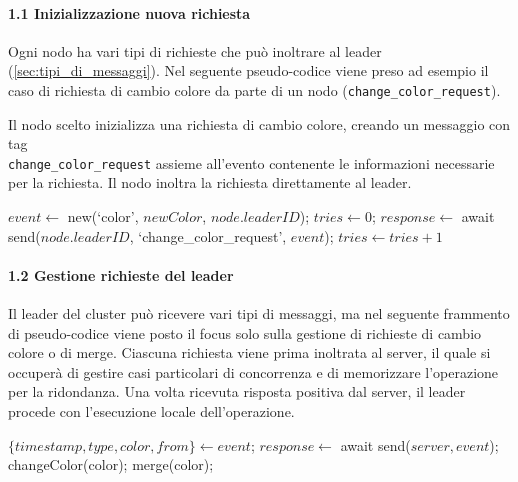 \documentclass[12pt, a4paper]{report}
\begin{document}
\paragraph{1.1 Inizializzazione nuova richiesta}

Ogni nodo ha vari tipi di richieste che pu\`o inoltrare al leader (\ref{sec:tipi_di_messaggi}). Nel seguente pseudo-codice viene preso ad esempio il caso di richiesta di cambio colore da parte di un nodo (\texttt{change\_color\_request}).

Il nodo scelto inizializza una richiesta di cambio colore, creando un messaggio con tag \\ \texttt{change\_color\_request} assieme all'evento contenente le informazioni necessarie per la richiesta. Il nodo inoltra la richiesta direttamente al leader.

\begin{algorithm}[H]
\caption{Inizializzazione richiesta di cambio colore}
\begin{algorithmic}[1]
    \State $event \gets$ new(`color', $newColor$, $node.leaderID$);
    \State $tries \gets 0$;
    \Do
        \State $response \gets$ await send($node.leaderID$, `change\_color\_request', $event$);
        \State $tries \gets tries + 1$
\EndProcedure
\end{algorithmic}
\end{algorithm}

\paragraph{1.2 Gestione richieste del leader}

Il leader del cluster pu\`o ricevere vari tipi di messaggi, ma nel seguente frammento di pseudo-codice viene posto il focus solo sulla gestione di richieste di cambio colore o di merge. Ciascuna richiesta viene prima inoltrata al server, il quale si occuper\`a di gestire casi particolari di concorrenza e di memorizzare l'operazione per la ridondanza. Una volta ricevuta risposta positiva dal server, il leader procede con l'esecuzione locale dell'operazione.

\begin{algorithm}[H]
\caption{Gestione delle richieste nodo leader}
\begin{algorithmic}[1]
    \State $\{timestamp, type, color, from\} \gets event$;
        \State $response \gets$ await send($server, event$);
                \State changeColor(color);
                \State merge(color);
            \EndIf
        \EndIf
    \EndIf
\EndProcedure
\end{algorithmic}
\end{algorithm}
\end{document}
